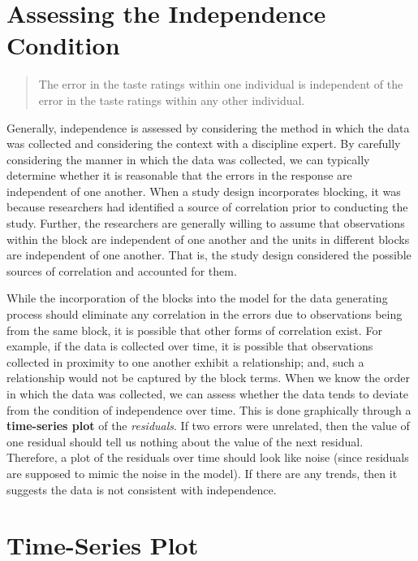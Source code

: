 \documentclass[
  letterpaper,
  DIV=11,
  numbers=noendperiod]{scrreprt}
\theoremstyle{definition}
\theoremstyle{definition}
\theoremstyle{plain}
\theoremstyle{remark}
\begin{document}
\hypertarget{assessing-the-independence-condition-2}{%
\section{Assessing the Independence
Condition}\label{assessing-the-independence-condition-2}}

\begin{quote}
The error in the taste ratings within one individual is independent of
the error in the taste ratings within any other individual.
\end{quote}

Generally, independence is assessed by considering the method in which
the data was collected and considering the context with a discipline
expert. By carefully considering the manner in which the data was
collected, we can typically determine whether it is reasonable that the
errors in the response are independent of one another. When a study
design incorporates blocking, it was because researchers had identified
a source of correlation prior to conducting the study. Further, the
researchers are generally willing to assume that observations within the
block are independent of one another and the units in different blocks
are independent of one another. That is, the study design considered the
possible sources of correlation and accounted for them.

While the incorporation of the blocks into the model for the data
generating process should eliminate any correlation in the errors due to
observations being from the same block, it is possible that other forms
of correlation exist. For example, if the data is collected over time,
it is possible that observations collected in proximity to one another
exhibit a relationship; and, such a relationship would not be captured
by the block terms. When we know the order in which the data was
collected, we can assess whether the data tends to deviate from the
condition of independence over time. This is done graphically through a
\textbf{time-series plot} of the \emph{residuals}. If two errors were
unrelated, then the value of one residual should tell us nothing about
the value of the next residual. Therefore, a plot of the residuals over
time should look like noise (since residuals are supposed to mimic the
noise in the model). If there are any trends, then it suggests the data
is not consistent with independence.

\hypertarget{time-series-plot-2}{%
\section{Time-Series Plot}\label{time-series-plot-2}}
\end{document}
